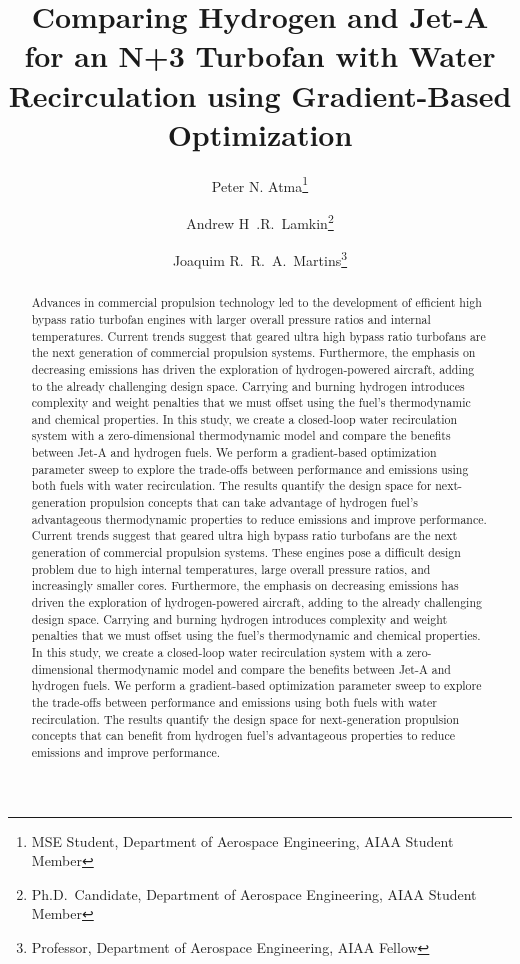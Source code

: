 \documentclass[conf]{new-aiaa}
\title{Comparing Hydrogen and Jet-A for an N+3 Turbofan with Water Recirculation using Gradient-Based Optimization} %
\author{Peter N. Atma\footnote{MSE Student, Department of Aerospace Engineering, AIAA Student Member}}
\author{Andrew H~.R.~Lamkin\footnote{Ph.D.~Candidate, Department of Aerospace Engineering, AIAA Student Member}}
\author{Joaquim R.~R.~A.~Martins\footnote{Professor, Department of Aerospace Engineering, AIAA Fellow}}
\affil{University of Michigan, Ann Arbor, MI, 48109}
\begin{document}
\maketitle

\begin{abstract}
  Advances in commercial propulsion technology led to the development of efficient high bypass ratio turbofan engines with larger overall pressure ratios and internal temperatures.
  Current trends suggest that geared ultra high bypass ratio turbofans are the next generation of commercial propulsion systems.
  Furthermore, the emphasis on decreasing emissions has driven the exploration of hydrogen-powered aircraft, adding to the already challenging design space.
  Carrying and burning hydrogen introduces complexity and weight penalties that we must offset using the fuel's thermodynamic and chemical properties.
  In this study, we create a closed-loop water recirculation system with a zero-dimensional thermodynamic model and compare the benefits between Jet-A and hydrogen fuels.
  We perform a gradient-based optimization parameter sweep to explore the trade-offs between performance and emissions using both fuels with water recirculation.
  The results quantify the design space for next-generation propulsion concepts that can take advantage of hydrogen fuel's advantageous thermodynamic properties to reduce emissions and improve performance.
  Current trends suggest that geared ultra high bypass ratio turbofans are the next generation of commercial propulsion systems.
  These engines pose a difficult design problem due to high internal temperatures, large overall pressure ratios, and increasingly smaller cores.
  Furthermore, the emphasis on decreasing emissions has driven the exploration of hydrogen-powered aircraft, adding to the already challenging design space.
  Carrying and burning hydrogen introduces complexity and weight penalties that we must offset using the fuel's thermodynamic and chemical properties.
  In this study, we create a closed-loop water recirculation system with a zero-dimensional thermodynamic model and compare the benefits between Jet-A and hydrogen fuels.
  We perform a gradient-based optimization parameter sweep to explore the trade-offs between performance and emissions using both fuels with water recirculation.
  The results quantify the design space for next-generation propulsion concepts that can benefit from hydrogen fuel's advantageous properties to reduce emissions and improve performance.
\end{abstract}
\end{document}
